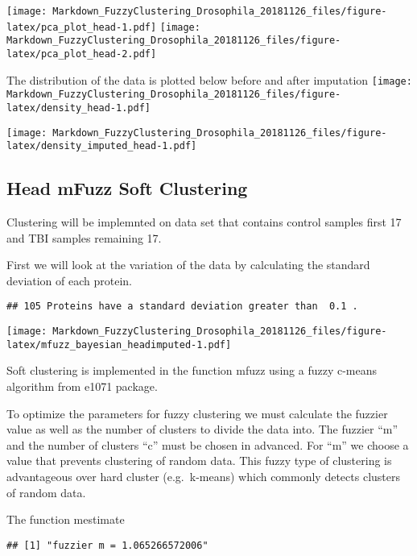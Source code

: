 \documentclass[]{article}
\newenvironment{Shaded}{\begin{snugshade}}{\end{snugshade}}
\newcommand{\KeywordTok}[1]{\textcolor[rgb]{0.13,0.29,0.53}{\textbf{#1}}}
\newcommand{\DataTypeTok}[1]{\textcolor[rgb]{0.13,0.29,0.53}{#1}}
\newcommand{\DecValTok}[1]{\textcolor[rgb]{0.00,0.00,0.81}{#1}}
\newcommand{\StringTok}[1]{\textcolor[rgb]{0.31,0.60,0.02}{#1}}
\newcommand{\CommentTok}[1]{\textcolor[rgb]{0.56,0.35,0.01}{\textit{#1}}}
\newcommand{\ControlFlowTok}[1]{\textcolor[rgb]{0.13,0.29,0.53}{\textbf{#1}}}
\newcommand{\OperatorTok}[1]{\textcolor[rgb]{0.81,0.36,0.00}{\textbf{#1}}}
\newcommand{\NormalTok}[1]{#1}
\begin{document}
\texttt{[image: Markdown\_FuzzyClustering\_Drosophila\_20181126\_files/figure-latex/pca\_plot\_head-1.pdf]}
\texttt{[image: Markdown\_FuzzyClustering\_Drosophila\_20181126\_files/figure-latex/pca\_plot\_head-2.pdf]}

The distribution of the data is plotted below before and after
imputation
\texttt{[image: Markdown\_FuzzyClustering\_Drosophila\_20181126\_files/figure-latex/density\_head-1.pdf]}

\texttt{[image: Markdown\_FuzzyClustering\_Drosophila\_20181126\_files/figure-latex/density\_imputed\_head-1.pdf]}

\subsection{Head mFuzz Soft
Clustering}\label{head-mfuzz-soft-clustering}

Clustering will be implemnted on data set that contains control samples
first 17 and TBI samples remaining 17.

First we will look at the variation of the data by calculating the
standard deviation of each protein.

\begin{verbatim}
## 105 Proteins have a standard deviation greater than  0.1 .
\end{verbatim}

\texttt{[image: Markdown\_FuzzyClustering\_Drosophila\_20181126\_files/figure-latex/mfuzz\_bayesian\_headimputed-1.pdf]}

Soft clustering is implemented in the function mfuzz using a fuzzy
c-means algorithm from e1071 package.

To optimize the parameters for fuzzy clustering we must calculate the
fuzzier value as well as the number of clusters to divide the data into.
The fuzzier ``m'' and the number of clusters ``c'' must be chosen in
advanced. For ``m'' we choose a value that prevents clustering of random
data. This fuzzy type of clustering is advantageous over hard cluster
(e.g.~k-means) which commonly detects clusters of random data.

The function mestimate

\begin{verbatim}
## [1] "fuzzier m = 1.065266572006"
\end{verbatim}

\begin{Shaded}
\end{Shaded}
\end{document}
